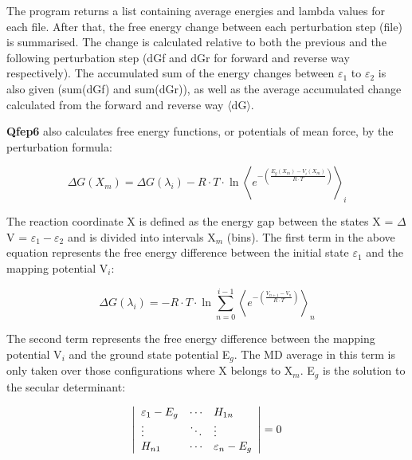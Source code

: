 \documentclass[a4paper,11pt]{article}
\begin{document}
The program returns a list containing average energies and lambda
values for each file. After that, the free energy change between
each perturbation step (file) is summarised. The change is
calculated relative to both the previous and the following
perturbation step (dGf and dGr for forward and reverse way
respectively). The accumulated sum of the energy changes between
$\varepsilon_{1}$ to $\varepsilon_{2}$ is also given (sum(dGf) and
sum(dGr)), as well as the average accumulated change calculated
from the forward and reverse way $\langle$dG$\rangle$.

\textbf{Qfep6} also calculates free energy functions, or potentials of mean
force, by the perturbation formula:

\begin {equation}
\Delta G(X_m) = \Delta G(\lambda_i) - R\cdot T\cdot \ln
\left\langle {e^{- \left( \frac{E_g (X_m)- V_i (X_m)}{R\cdot
T}\right)}} \right\rangle_i
\end{equation}

The reaction coordinate X is defined as the energy gap between the
states X = $\Delta$V = $\varepsilon_1 - \varepsilon_2$ and is
divided into intervals X$_{m}$ (bins). The first term in the above
equation represents the free energy difference between the initial
state $\varepsilon_{1}$ and the mapping potential V$_{i}$:

\begin {equation}
\Delta G\left( \lambda_i \right) = - R\cdot T\cdot \ln \sum
\limits_{n=0}^{i-1} {\left\langle e^{- \left( \frac{V_{n+1} -V_n
}{R\cdot T}\right)} \right\rangle _n }
\end{equation}

The second term represents the free energy difference between the
mapping potential V$_{i}$ and the ground state potential E$_{g}$.
The MD average in this term is only taken over those
configurations where X belongs to X$_{m}$. E$_{g}$ is the solution
to the secular determinant:

\begin {equation}
\label{secular_determinant} \left| {{\begin{array}{*{20}c}
 {\varepsilon _1 - E_g } \hfill & \cdots \hfill & H_{1n} \hfill \\
 \vdots \hfill & \ddots \hfill & \vdots \hfill \\
 H_{n1} \hfill & \cdots \hfill & {\varepsilon _n - E_g } \hfill \\
\end{array} }} \right|=0
\end{equation}
\end{document}
